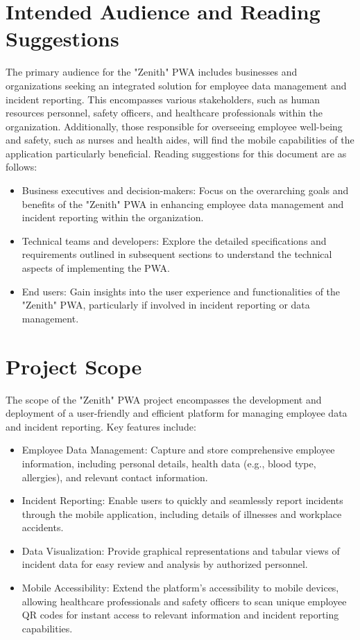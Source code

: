 \documentclass{scrreprt}
\begin{document}
\section{Intended Audience and Reading Suggestions}
The primary audience for the "Zenith" PWA includes businesses and organizations seeking an integrated solution for employee data management and incident reporting. This encompasses various stakeholders, such as human resources personnel, safety officers, and healthcare professionals within the organization. Additionally, those responsible for overseeing employee well-being and safety, such as nurses and health aides, will find the mobile capabilities of the application particularly beneficial.
\newline
\newline
Reading suggestions for this document are as follows:

\begin{itemize}
    \item Business executives and decision-makers: Focus on the overarching goals and benefits of the "Zenith" PWA in enhancing employee data management and incident reporting within the organization.
    \item Technical teams and developers: Explore the detailed specifications and requirements outlined in subsequent sections to understand the technical aspects of implementing the PWA.
    \item End users: Gain insights into the user experience and functionalities of the "Zenith" PWA, particularly if involved in incident reporting or data management.
\end{itemize}

\section{Project Scope}
The scope of the "Zenith" PWA project encompasses the development and deployment of a user-friendly and efficient platform for managing employee data and incident reporting.
\newline
\newline
Key features include:

\begin{itemize}
    \item Employee Data Management: Capture and store comprehensive employee information, including personal details, health data (e.g., blood type, allergies), and relevant contact information.
    \item Incident Reporting: Enable users to quickly and seamlessly report incidents through the mobile application, including details of illnesses and workplace accidents.
    \item Data Visualization: Provide graphical representations and tabular views of incident data for easy review and analysis by authorized personnel.
    \item Mobile Accessibility: Extend the platform's accessibility to mobile devices, allowing healthcare professionals and safety officers to scan unique employee QR codes for instant access to relevant information and incident reporting capabilities.
\end{itemize}
\end{document}

